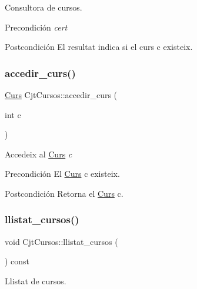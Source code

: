 Consultora de cursos. 

\begin{DoxyPrecond}{Precondición}
{\itshape cert} 
\end{DoxyPrecond}
\begin{DoxyPostcond}{Postcondición}
El resultat indica si el curs c existeix. 
\end{DoxyPostcond}
\mbox{\label{class_cjt_cursos_a8aa7b83511051aee39b4942df8e4b2b0}} 
\subsubsection{\texorpdfstring{accedir\+\_\+curs()}{accedir\_curs()}}
{\footnotesize\ttfamily \mbox{\hyperlink{class_curs}{Curs}} Cjt\+Cursos\+::accedir\+\_\+curs (\begin{DoxyParamCaption}\item[{int}]{c }\end{DoxyParamCaption})}



Accedeix al \mbox{\hyperlink{class_curs}{Curs}} {\itshape c} 

\begin{DoxyPrecond}{Precondición}
El \mbox{\hyperlink{class_curs}{Curs}} c existeix. 
\end{DoxyPrecond}
\begin{DoxyPostcond}{Postcondición}
Retorna el \mbox{\hyperlink{class_curs}{Curs}} c. 
\end{DoxyPostcond}
\mbox{\label{class_cjt_cursos_a9a772bfad772e507fa9b8f5194b13873}} 
\subsubsection{\texorpdfstring{llistat\+\_\+cursos()}{llistat\_cursos()}}
{\footnotesize\ttfamily void Cjt\+Cursos\+::llistat\+\_\+cursos (\begin{DoxyParamCaption}{ }\end{DoxyParamCaption}) const}



Llistat de cursos. 

